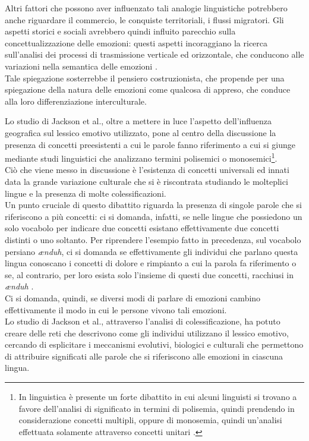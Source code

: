 Altri fattori che possono aver influenzato tali analogie linguistiche potrebbero anche riguardare il commercio, le conquiste territoriali, i flussi migratori. Gli aspetti storici e sociali avrebbero quindi influito parecchio sulla concettualizzazione delle emozioni: questi aspetti incoraggiano la ricerca sull'analisi dei processi di trasmissione verticale ed orizzontale, che conducono alle variazioni nella semantica delle emozioni \parencite{majid_jackson}. \\
Tale spiegazione sosterrebbe il pensiero costruzionista, che propende per una spiegazione della natura delle emozioni come qualcosa di appreso, che conduce alla loro differenziazione interculturale. 

Lo studio di Jackson et al., oltre a mettere in luce l'aspetto dell'influenza geografica sul lessico emotivo utilizzato, pone al centro della discussione la presenza di concetti preesistenti a cui le parole fanno riferimento a cui si giunge mediante studi linguistici che analizzano termini polisemici o monosemici\footnote{In linguistica è presente un forte dibattito in cui alcuni linguisti si trovano a favore dell'analisi di significato in termini di polisemia, quindi prendendo in considerazione concetti multipli, oppure di monosemia, quindi un'analisi effettuata solamente attraverso concetti unitari \parencite{majid_jackson}.}. \\
Ciò che viene messo in discussione è l'esistenza di concetti universali ed innati data la grande variazione culturale che si è riscontrata studiando le molteplici lingue e la presenza di molte colessificazioni.\\
Un punto cruciale di questo dibattito riguarda la presenza di singole parole che si riferiscono a più concetti: ci si domanda, infatti, se nelle lingue che possiedono un solo vocabolo per indicare due concetti esistano effettivamente due concetti distinti o uno soltanto. Per riprendere l'esempio fatto in precedenza, sul vocabolo persiano \textit{ænduh}, ci si domanda se effettivamente gli individui che parlano questa lingua conoscano i concetti di dolore e rimpianto a cui la parola fa riferimento o se, al contrario, per loro esista solo l'insieme di questi due concetti, racchiusi in \textit{ænduh} \parencite{jackson_joshua}. \\
Ci si domanda, quindi, se diversi modi di parlare di emozioni cambino effettivamente il modo in cui le persone vivono tali emozioni.\\
Lo studio di Jackson et al., attraverso l'analisi di colessificazione, ha potuto creare delle reti che descrivono come gli individui utilizzano il lessico emotivo, cercando di esplicitare i meccanismi evolutivi, biologici e culturali che permettono di attribuire significati alle parole che si riferiscono alle emozioni in ciascuna lingua. 

